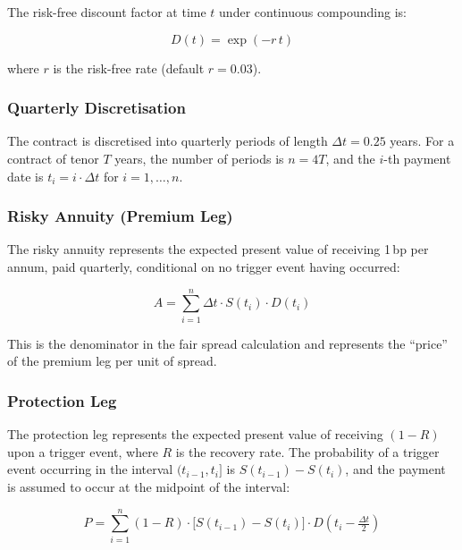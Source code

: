 \documentclass[11pt,a4paper]{article}
\begin{document}
The risk-free discount factor at time $t$ under continuous compounding is:

\begin{equation}
    D(t) = \exp(-r\, t)
    \label{eq:discount}
\end{equation}

\noindent where $r$ is the risk-free rate (default $r = 0.03$).

\subsubsection{Quarterly Discretisation}

The contract is discretised into quarterly periods of length $\Delta t = 0.25$ years.
For a contract of tenor $T$ years, the number of periods is $n = 4T$, and the $i$-th
payment date is $t_i = i \cdot \Delta t$ for $i = 1, \ldots, n$.

\subsubsection{Risky Annuity (Premium Leg)}

The risky annuity represents the expected present value of receiving 1\,bp per annum,
paid quarterly, conditional on no trigger event having occurred:

\begin{equation}
    A = \sum_{i=1}^{n} \Delta t \cdot S(t_i) \cdot D(t_i)
    \label{eq:risky_annuity}
\end{equation}

This is the denominator in the fair spread calculation and represents the ``price''
of the premium leg per unit of spread.

\subsubsection{Protection Leg}

The protection leg represents the expected present value of receiving $(1 - R)$ upon
a trigger event, where $R$ is the recovery rate. The probability of a trigger event
occurring in the interval $(t_{i-1}, t_i]$ is $S(t_{i-1}) - S(t_i)$, and the payment
is assumed to occur at the midpoint of the interval:

\begin{equation}
    P = \sum_{i=1}^{n} (1 - R) \cdot \big[S(t_{i-1}) - S(t_i)\big] \cdot D\!\left(t_i - \tfrac{\Delta t}{2}\right)
    \label{eq:protection_leg}
\end{equation}
\end{document}
